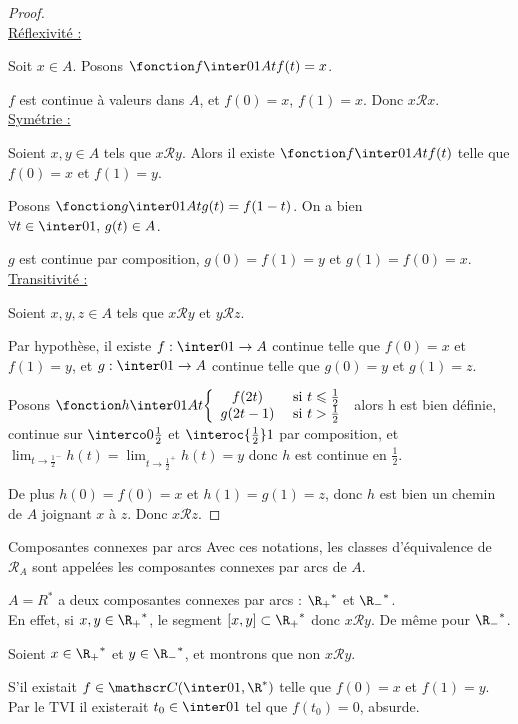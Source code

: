 \begin{proof}~\\
    \uline{Réflexivité :}

    \svspace Soit $x \in A$. Posons $\fonction f {\inter 0 1} A t {f(t) = x}$. 

    $f$ est continue à valeurs dans $A$, et $f(0) = x$, $f(1) = x$. Donc $x \mathcal R x$.\\

    \uline{Symétrie :}

    Soient $x, y \in A$ tels que $x \mathcal R y$. Alors il existe $\fonction f {\inter 0 1} A t {f(t)}$
    telle que $f(0) = x$ et $f(1) = y$.

    Posons $\fonction g {\inter 0 1} A t {g(t) = f(1 - t)}$. On a bien $\forall t \in \inter 0 1, \, g(t) \in A$. 

    $g$ est continue par composition, $g(0) = f(1) = y$ et $g(1) = f(0) = x$. \\

    \uline{Transitivité :}

    Soient $x, y, z \in A$ tels que $x \mathcal R y$ et $y \mathcal R z$.

    Par hypothèse, il existe $f : \inter 0 1 \to A$ continue telle que $f(0) = x$ et $f(1) = y$, 
    et $g : \inter 0 1 \to A$ continue telle que $g(0) = y$ et $g(1) = z$.

    Posons $\fonction h {\inter 0 1} A t { \left\{ \begin{array}{cc} 
        f(2t) & \text{ si } t \leqslant \frac 1 2 \\
        g(2t - 1) & \text{ si } t > \frac 1 2
    \end{array} \right. }$ alors h est bien définie, continue sur $\interco 0 {\frac 1 2}$ et $\interoc {\frac 1 2} 1$ par 
    composition, et $\displaystyle \lim_{t \to \frac 1 2^-} h(t) = \lim_{t \to \frac 1 2^+} h(t) = y$ donc $h$ est continue en $\frac 1 2$.

    De plus $h(0) = f(0) = x$ et $h(1) = g(1) = z$, donc $h$ est bien un chemin de 
    $A$ joignant $x$ à $z$. Donc $x \mathcal R z$.
\end{proof}

\begin{definition}{Composantes connexes par arcs}{}
    Avec ces notations, les classes d'équivalence de $\mathcal R_A$ sont appelées 
    les composantes connexes par arcs de $A$.
\end{definition}

\begin{exemple}
    $A = R^*$ a deux composantes connexes par arcs : ${\R_+}^*$ et ${\R_-}^*$. \\

    En effet, si $x, y \in {\R_+}^*$, le segment $[x, y] \subset {\R_+}^*$ donc $x \mathcal R y$.
    De même pour ${\R_-}^*$.

    Soient $x \in {\R_+}^*$ et $y \in {\R_-}^*$, et montrons que non $x \mathcal{R} y$.

    S'il existait $f \in \mathscr C(\inter 0 1, \R^*)$ telle que $f(0) = x$ et $f(1) = y$.
    Par le TVI il existerait $t_0 \in \inter 0 1$ tel que $f(t_0) = 0$, absurde.
\end{exemple}

